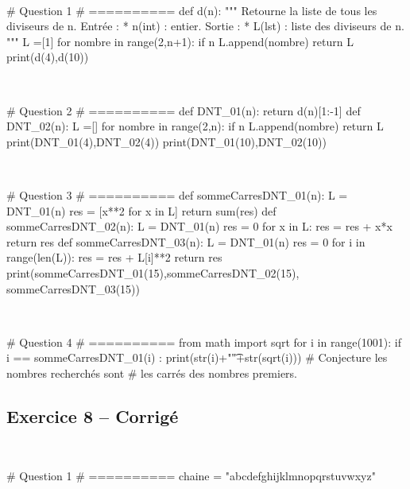 \documentclass[10pt,fleqn]{article} %
\begin{document}
\begin{multicols}{2}
\begin{corrige}
$\quad$
\begin{python}
# Question 1 
# ==========
def d(n):
    """
    Retourne la liste de tous les diviseurs de n.
    Entrée : 
     * n(int) : entier.
    Sortie : 
     * L(lst) : liste des diviseurs de n.
    """
    L =[1]
    for nombre in range(2,n+1):
        if n%
            L.append(nombre)
    return L
print(d(4),d(10))
\end{python}
\end{corrige}

\begin{corrige}
$\quad$
\begin{python}
# Question 2 
# ==========
def DNT_01(n):
    return d(n)[1:-1]
def DNT_02(n):
    L =[]
    for nombre in range(2,n):
        if n%
            L.append(nombre)
    return L
print(DNT_01(4),DNT_02(4))
print(DNT_01(10),DNT_02(10))
\end{python}
\end{corrige}


\begin{corrige}
$\quad$
\begin{python}
# Question 3
# ==========
def sommeCarresDNT_01(n):
    L = DNT_01(n)
    res = [x**2 for x in L]
    return sum(res)
def sommeCarresDNT_02(n):
    L = DNT_01(n)
    res = 0
    for x in L:
        res = res + x*x
    return res
def sommeCarresDNT_03(n):
    L = DNT_01(n)
    res = 0
    for i in range(len(L)):
        res = res + L[i]**2
    return res
print(sommeCarresDNT_01(15),sommeCarresDNT_02(15),
    sommeCarresDNT_03(15))
\end{python}
\end{corrige}


\begin{corrige}
$\quad$
\begin{python}
# Question 4
# ==========
from math import sqrt
for i in range(1001):
    if i == sommeCarresDNT_01(i) :
        print(str(i)+"\t"+str(sqrt(i)))
# Conjecture les nombres recherchés sont 
# les carrés des nombres premiers. 
\end{python}
\end{corrige}


\subsection*{Exercice 8 -- Corrigé}
\begin{corrige}
$\quad$
\begin{python}
# Question 1 
# ==========
chaine = "abcdefghijklmnopqrstuvwxyz"
\end{python}
\end{corrige}


\end{multicols}
\end{document}
